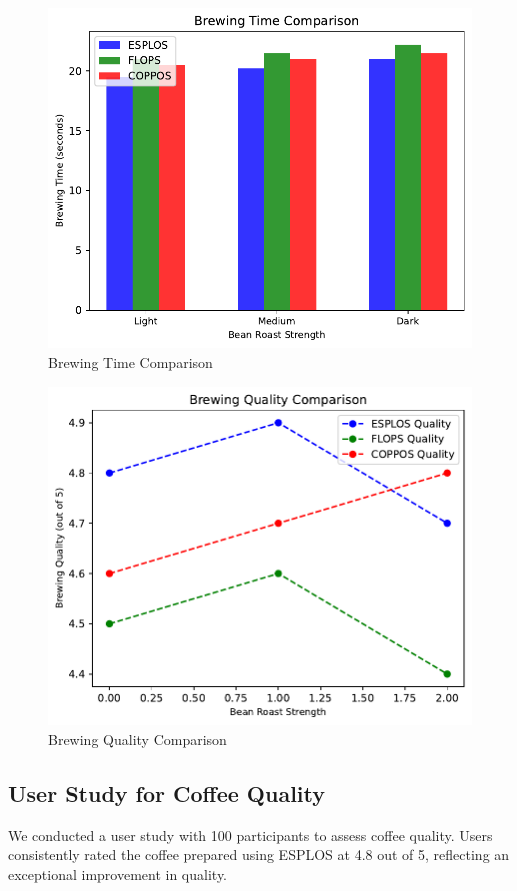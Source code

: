 \documentclass[nonacm,sigplan]{acmart}
\begin{document}
\begin{figure}
    \centering
    \includegraphics[width=0.8\linewidth]{brewing_time_comparison.pdf}
    \caption{Brewing Time Comparison}
    \label{fig:brewing_time}
  \end{figure}
  
  \begin{figure}
    \centering
    \includegraphics[width=0.8\linewidth]{brewing_quality_comparison.pdf}
    \caption{Brewing Quality Comparison}
    \label{fig:brewing_quality}
  \end{figure}

\subsection{User Study for Coffee Quality}
We conducted a user study with 100 participants to assess coffee quality. Users consistently rated the coffee prepared using ESPLOS at 4.8 out of 5, reflecting an exceptional improvement in quality.
\end{document}
